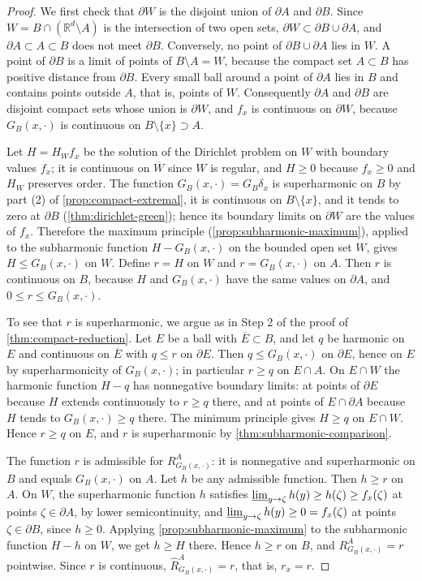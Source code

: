 \begin{proof}
We first check that $\partial W$ is the disjoint union of $\partial A$ and $\partial B$. Since $W=B\cap(\mathbb R^d\setminus A)$ is the intersection of two open sets, $\partial W\subset\partial B\cup\partial A$, and $\partial A\subset A\subset B$ does not meet $\partial B$. Conversely, no point of $\partial B\cup\partial A$ lies in $W$. A point of $\partial B$ is a limit of points of $B\setminus A=W$, because the compact set $A\subset B$ has positive distance from $\partial B$. Every small ball around a point of $\partial A$ lies in $B$ and contains points outside $A$, that is, points of $W$. Consequently $\partial A$ and $\partial B$ are disjoint compact sets whose union is $\partial W$, and $f_x$ is continuous on $\partial W$, because $G_B(x,\cdot)$ is continuous on $B\setminus\{x\}\supset A$.

Let $H=H_Wf_x$ be the solution of the Dirichlet problem on $W$ with boundary values $f_x$; it is continuous on $\overline W$ since $W$ is regular, and $H\geq0$ because $f_x\geq0$ and $H_W$ preserves order. The function $G_B(x,\cdot)=G_B\delta_x$ is superharmonic on $B$ by part (2) of \cref{prop:compact-extremal}, it is continuous on $B\setminus\{x\}$, and it tends to zero at $\partial B$ (\cref{thm:dirichlet-green}); hence its boundary limits on $\partial W$ are the values of $f_x$. Therefore the maximum principle (\cref{prop:subharmonic-maximum}), applied to the subharmonic function $H-G_B(x,\cdot)$ on the bounded open set $W$, gives $H\leq G_B(x,\cdot)$ on $W$. Define $r=H$ on $W$ and $r=G_B(x,\cdot)$ on $A$. Then $r$ is continuous on $B$, because $H$ and $G_B(x,\cdot)$ have the same values on $\partial A$, and $0\leq r\leq G_B(x,\cdot)$.

To see that $r$ is superharmonic, we argue as in Step 2 of the proof of \cref{thm:compact-reduction}. Let $E$ be a ball with $\overline E\subset B$, and let $q$ be harmonic on $E$ and continuous on $\overline E$ with $q\leq r$ on $\partial E$. Then $q\leq G_B(x,\cdot)$ on $\partial E$, hence on $E$ by superharmonicity of $G_B(x,\cdot)$; in particular $r\geq q$ on $E\cap A$. On $E\cap W$ the harmonic function $H-q$ has nonnegative boundary limits: at points of $\partial E$ because $H$ extends continuously to $r\geq q$ there, and at points of $E\cap\partial A$ because $H$ tends to $G_B(x,\cdot)\geq q$ there. The minimum principle gives $H\geq q$ on $E\cap W$. Hence $r\geq q$ on $E$, and $r$ is superharmonic by \cref{thm:subharmonic-comparison}.

The function $r$ is admissible for $R_{G_B(x,\cdot)}^A$: it is nonnegative and superharmonic on $B$ and equals $G_B(x,\cdot)$ on $A$. Let $h$ be any admissible function. Then $h\geq r$ on $A$. On $W$, the superharmonic function $h$ satisfies $\varliminf_{y\to\zeta}h(y)\geq h(\zeta)\geq f_x(\zeta)$ at points $\zeta\in\partial A$, by lower semicontinuity, and $\varliminf_{y\to\zeta}h(y)\geq0=f_x(\zeta)$ at points $\zeta\in\partial B$, since $h\geq0$. Applying \cref{prop:subharmonic-maximum} to the subharmonic function $H-h$ on $W$, we get $h\geq H$ there. Hence $h\geq r$ on $B$, and $R_{G_B(x,\cdot)}^A=r$ pointwise. Since $r$ is continuous, $\widehat R_{G_B(x,\cdot)}^A=r$, that is, $r_x=r$.


\end{proof}
